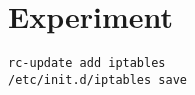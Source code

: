 \chapter{Experiment}





\begin{lstlisting}
rc-update add iptables 
/etc/init.d/iptables save
\end{lstlisting}



